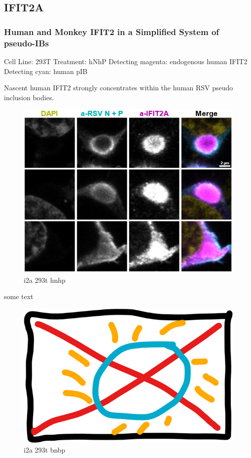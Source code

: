 \subsection{IFIT2A}
\subsubsection{Human and Monkey IFIT2 in a Simplified System of pseudo-IBs} \label{Human and Monkey IFIT2 in a Simplified System of pseudo-IBs}
Cell Line: 293T \newline
Treatment: hNhP \newline
Detecting magenta: endogenous human IFIT2 \newline
Detecting cyan: human pIB \newline

Nascent human IFIT2 strongly concentrates within the human RSV pseudo inclusion bodies.

\begin{figure}
    \centering
    \includegraphics[width=1\linewidth]{09. Chapter 4//Figs//01. I2A/01. i2a 293t hnhp.png}
    \caption[i2a 293t hnhp]{i2a 293t hnhp}
    \label{i2a 293t hnhp}
\end{figure}

some text

\begin{figure}
    \centering
    \includegraphics[width=0.5\linewidth]{09. Chapter 4//Figs//01. I2A/00. placeholder.png}
    \caption[i2a 293t bnbp]{i2a 293t bnbp}
    \label{i2a 293t bnbp}
\end{figure}

